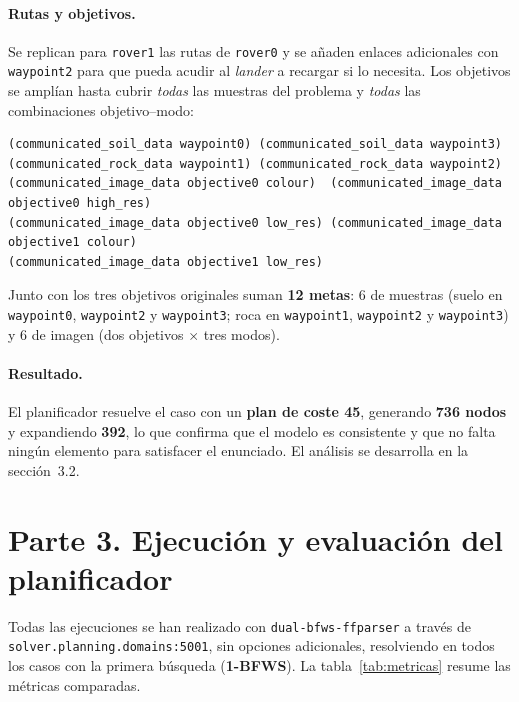 \documentclass[12pt,a4paper]{article}
\begin{document}
\paragraph{Rutas y objetivos.}
Se replican para \texttt{rover1} las rutas de \texttt{rover0} y se a\~naden
enlaces adicionales con \texttt{waypoint2} para que pueda acudir al
\emph{lander} a recargar si lo necesita. Los objetivos se ampl\'ian hasta
cubrir \emph{todas} las muestras del problema y \emph{todas} las
combinaciones objetivo--modo:

\begin{lstlisting}
(communicated_soil_data waypoint0) (communicated_soil_data waypoint3)
(communicated_rock_data waypoint1) (communicated_rock_data waypoint2)
(communicated_image_data objective0 colour)  (communicated_image_data objective0 high_res)
(communicated_image_data objective0 low_res) (communicated_image_data objective1 colour)
(communicated_image_data objective1 low_res)
\end{lstlisting}

Junto con los tres objetivos originales suman \textbf{12 metas}: 6 de
muestras (suelo en \texttt{waypoint0}, \texttt{waypoint2} y
\texttt{waypoint3}; roca en \texttt{waypoint1}, \texttt{waypoint2} y
\texttt{waypoint3}) y 6 de imagen (dos objetivos $\times$ tres modos).

\paragraph{Resultado.}
El planificador resuelve el caso con un \textbf{plan de coste 45},
generando \textbf{736 nodos} y expandiendo \textbf{392}, lo que confirma que
el modelo es consistente y que no falta ning\'un elemento para satisfacer el
enunciado. El an\'alisis se desarrolla en la secci\'on~3.2.

\section{Parte 3. Ejecuci\'on y evaluaci\'on del planificador}

Todas las ejecuciones se han realizado con \texttt{dual-bfws-ffparser} a
trav\'es de \texttt{solver.planning.domains:5001}, sin opciones adicionales,
resolviendo en todos los casos con la primera b\'usqueda (\textbf{1-BFWS}).
La tabla~\ref{tab:metricas} resume las m\'etricas comparadas.
\end{document}
